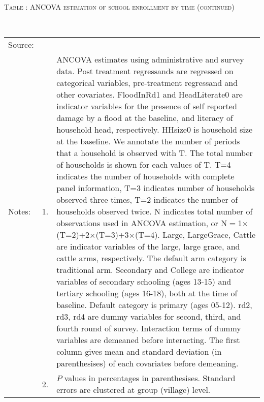 \addtocounter{table}{-1}
\hspace{-1cm}\begin{minipage}[t]{14cm}
\hfil\textsc{\normalsize Table \thetable: ANCOVA estimation of school enrollment by time (continued)\label{tab ANCOVA enroll time varying2}}\\
\setlength{\tabcolsep}{1pt}
\setlength{\baselineskip}{8pt}
\renewcommand{\arraystretch}{.525}
\hfil{}\\
\renewcommand{\arraystretch}{.8}
\setlength{\tabcolsep}{1pt}
\hspace{-1cm}\begin{tabular}{>{\hfill\scriptsize}p{1cm}<{}>{\hfill\scriptsize}p{.25cm}<{}>{\scriptsize}p{14cm}<{\hfill}}
Source:& \multicolumn{2}{l}{\scriptsize Estimated with GUK administrative and survey data.}\\
Notes: & 1. & ANCOVA estimates using administrative and survey data. Post treatment regressands are regressed on categorical variables, pre-treatment regressand and other covariates. \textsf{FloodInRd1} and \textsf{HeadLiterate0} are indicator variables for the presence of self reported damage by a flood at the baseline, and literacy of household head, respectively. \textsf{HHsize0} is household size at the baseline. We annotate the number of periods that a household is observed with \textsf{T}. The total number of households is shown for each values of \textsf{T}. \textsf{T=4} indicates the number of households with complete panel information, \textsf{T=3} indicates number of households observed three times, \textsf{T=2} indicates the number of households observed twice. \textsf{N} indicates total number of observations used in ANCOVA estimation, or \textsf{N$=$1$\times$(T=2)+2$\times$(T=3)+3$\times$(T=4)}.  \textsf{Large}, \textsf{LargeGrace}, \textsf{Cattle} are indicator variables of the \textsf{large}, \textsf{large grace}, and \textsf{cattle} arms, respectively. The default arm category is \textsf{traditional} arm. \textsf{Secondary} and \textsf{College} are indicator variables of secondary schooling (ages 13-15) and tertiary schooling (ages 16-18), both at the time of baseline. Default category is primary (ages 05-12). \textsf{rd2, rd3, rd4} are dummy variables for second, third, and fourth round of survey. Interaction terms of dummy variables are demeaned before interacting. The first column gives mean and standard deviation (in parenthesises) of each covariates before demeaning.\\
& 2. & $P$ values in percentages in parenthesises. Standard errors are clustered at group (village) level.%
\end{tabular}
\end{minipage}


